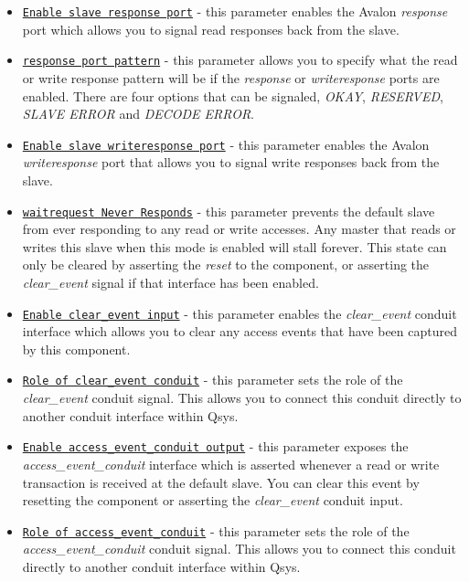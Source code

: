 \documentclass{article}
\begin{document}
\begin{flushleft}
\begin{itemize}
\item \texttt{\underline{Enable slave response port}} - this parameter enables the Avalon \emph{response} port which allows you to signal read responses back from the slave.

\item \texttt{\underline{response port pattern}} - this parameter allows you to specify what the read or write response pattern will be if the \emph{response} or \emph{writeresponse} ports are enabled.  There are four options that can be signaled, \emph{OKAY}, \emph{RESERVED}, \emph{SLAVE ERROR} and \emph{DECODE ERROR}.

\item \texttt{\underline{Enable slave writeresponse port}} - this parameter enables the Avalon \emph{writeresponse} port that allows you to signal write responses back from the slave.

\item \texttt{\underline{waitrequest Never Responds}} - this parameter prevents the default slave from ever responding to any read or write accesses.  Any master that reads or writes this slave when this mode is enabled will stall forever.  This state can only be cleared by asserting the \emph{reset} to the component, or asserting the \emph{clear\_event} signal if that interface has been enabled.

\item \texttt{\underline{Enable clear\_event input}} - this parameter enables the \emph{clear\_event} conduit interface which allows you to clear any access events that have been captured by this component.

\item \texttt{\underline{Role of clear\_event conduit}} - this parameter sets the role of the \emph{clear\_event} conduit signal.  This allows you to connect this conduit directly to another conduit interface within Qsys.

\item \texttt{\underline{Enable access\_event\_conduit output}} - this parameter exposes the \emph{access\_event\_conduit} interface which is asserted whenever a read or write transaction is received at the default slave.  You can clear this event by resetting the component or asserting the \emph{clear\_event} conduit input.

\item \texttt{\underline{Role of access\_event\_conduit}} - this parameter sets the role of the \emph{access\_event\_conduit} conduit signal.  This allows you to connect this conduit directly to another conduit interface within Qsys.


\end{itemize}
\end{flushleft}
\end{document}
